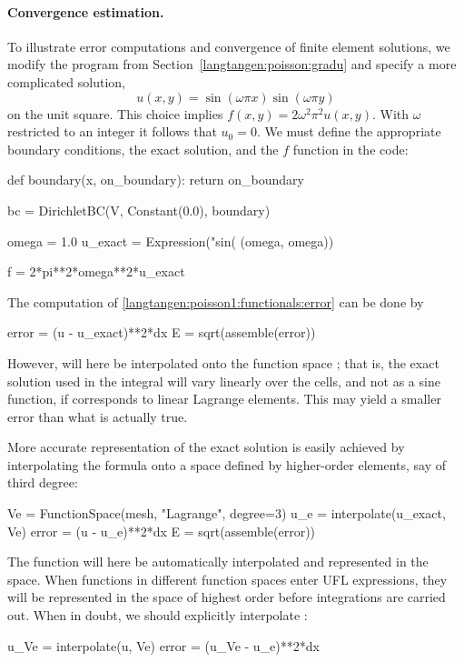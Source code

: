 \paragraph{Convergence estimation.}
To illustrate error computations and convergence of finite element
solutions, we modify the  program from
Section~\ref{langtangen:poisson:gradu} and specify a more complicated
solution,
\begin{equation}
   u(x,y) = \sin(\omega\pi x)\sin(\omega\pi y)
\end{equation}
on the unit square.  This choice implies $f(x,y)=2\omega^2\pi^2 u(x,y)$.
With $\omega$ restricted to an integer it follows that $u_0=0$. We must
define the appropriate boundary conditions, the exact solution, and the
$f$ function in the code:
\begin{python}
def boundary(x, on_boundary):
    return on_boundary

bc = DirichletBC(V, Constant(0.0), boundary)

omega = 1.0
u_exact = Expression("sin(%
                     (omega, omega))

f = 2*pi**2*omega**2*u_exact
\end{python}

The computation of \eqref{langtangen:poisson1:functionals:error} can be
done by
\begin{python}
error = (u - u_exact)**2*dx
E = sqrt(assemble(error))
\end{python}
However,  will here be interpolated onto the function
space ; that is, the exact solution used in the integral will
vary linearly over the cells, and not as a sine function, if 
corresponds to linear Lagrange elements.  This may yield a smaller error
 than what is actually true.

More accurate representation of the exact solution is easily achieved by
interpolating the formula onto a space defined by higher-order elements,
say of third degree:
\begin{python}
Ve = FunctionSpace(mesh, "Lagrange", degree=3)
u_e = interpolate(u_exact, Ve)
error = (u - u_e)**2*dx
E = sqrt(assemble(error))
\end{python}
The  function will here be automatically interpolated and
represented in the  space. When functions in different function
spaces enter UFL expressions, they will be represented in the space
of highest order before integrations are carried out. When in doubt,
we should explicitly interpolate :
\begin{python}
u_Ve = interpolate(u, Ve)
error = (u_Ve - u_e)**2*dx
\end{python}

